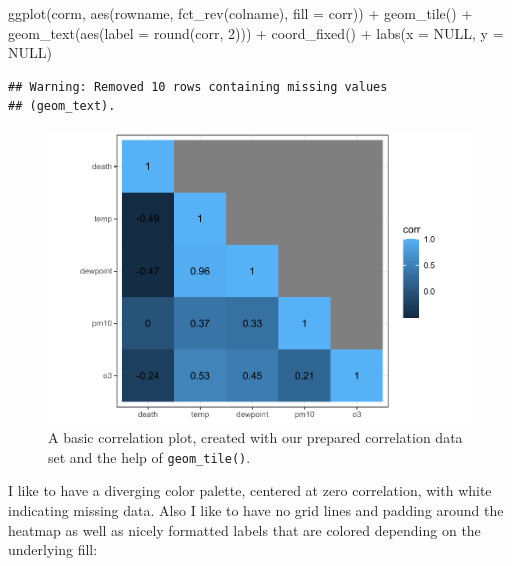 \documentclass[
]{krantz}
\makeatletter
\newenvironment{Shaded}{\begin{snugshade}}{\end{snugshade}}
\newcommand{\AttributeTok}[1]{\textcolor[rgb]{0.61,0.61,0.61}{#1}}
\newcommand{\ConstantTok}[1]{\textcolor[rgb]{0,0,0}{#1}}
\newcommand{\DecValTok}[1]{\textcolor[rgb]{0.06,0.06,0.06}{#1}}
\newcommand{\FunctionTok}[1]{\textcolor[rgb]{0,0,0}{#1}}
\newcommand{\NormalTok}[1]{#1}
\newcommand{\SpecialCharTok}[1]{\textcolor[rgb]{0,0,0}{#1}}
\newenvironment{kframe}{%
\medskip{}
\setlength{\fboxsep}{.8em}
 \def\at@end@of@kframe{}%
 \ifinner\ifhmode%
  \def\at@end@of@kframe{\end{minipage}}%
  \begin{minipage}{\columnwidth}%
 \fi\fi%
 \def\FrameCommand##1{\hskip\@totalleftmargin \hskip-\fboxsep
 \colorbox{shadecolor}{##1}\hskip-\fboxsep
     \hskip-\linewidth \hskip-\@totalleftmargin \hskip\columnwidth}%
 \MakeFramed {\advance\hsize-\width
   \@totalleftmargin\z@ \linewidth\hsize
   \@setminipage}}%
 {\par\unskip\endMakeFramed%
 \at@end@of@kframe}
\renewenvironment{Shaded}{\begin{kframe}}{\end{kframe}}
\makeatother
\begin{document}
\begin{Shaded}
\begin{Highlighting}[]
\FunctionTok{ggplot}\NormalTok{(corm, }\FunctionTok{aes}\NormalTok{(rowname, }\FunctionTok{fct\_rev}\NormalTok{(colname),}
                 \AttributeTok{fill =}\NormalTok{ corr)) }\SpecialCharTok{+}
  \FunctionTok{geom\_tile}\NormalTok{() }\SpecialCharTok{+}
  \FunctionTok{geom\_text}\NormalTok{(}\FunctionTok{aes}\NormalTok{(}\AttributeTok{label =} \FunctionTok{round}\NormalTok{(corr, }\DecValTok{2}\NormalTok{))) }\SpecialCharTok{+}
  \FunctionTok{coord\_fixed}\NormalTok{() }\SpecialCharTok{+}
  \FunctionTok{labs}\NormalTok{(}\AttributeTok{x =} \ConstantTok{NULL}\NormalTok{, }\AttributeTok{y =} \ConstantTok{NULL}\NormalTok{)}
\end{Highlighting}
\end{Shaded}

\begin{verbatim}
## Warning: Removed 10 rows containing missing values
## (geom_text).
\end{verbatim}

\begin{figure}
\centering
\includegraphics{bookdown_files/figure-latex/tile-corr-plot-1.pdf}
\caption{\label{fig:tile-corr-plot}A basic correlation plot, created with our prepared correlation data set and the help of \texttt{geom\_tile()}.}
\end{figure}

I like to have a diverging color palette, centered at zero correlation, with white indicating missing data. Also I like to have no grid lines and padding around the heatmap as well as nicely formatted labels that are colored depending on the underlying fill:
\end{document}
